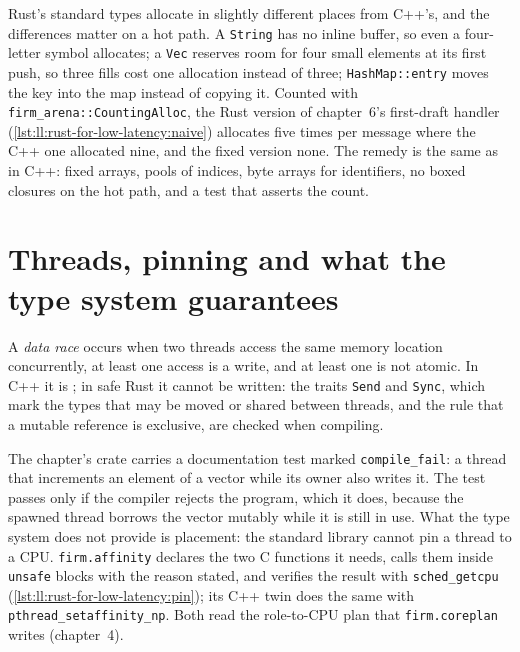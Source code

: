 Rust's standard types allocate in slightly different places from C++'s, and the differences matter on a hot path. A
\texttt{String} has no inline buffer, so even a four-letter symbol allocates; a \texttt{Vec} reserves room for four small
elements at its first push, so three fills cost one allocation instead of three; \texttt{HashMap::entry} moves the key into
the map instead of copying it. Counted with \texttt{firm\_arena::CountingAlloc}, the Rust version of chapter~6's first-draft
handler (\cref{lst:ll:rust-for-low-latency:naive}) allocates five times per message where the C++ one allocated nine, and the
fixed version none. The remedy is the same as in C++: fixed arrays, pools of indices, byte arrays for identifiers, no boxed
closures on the hot path, and a test that asserts the count.

\label{lst:ll:rust-for-low-latency:naive}

\section{Threads, pinning and what the type system guarantees}

\begin{definition}\label{def:ll:rust-for-low-latency:race}
A \emph{data race} occurs when two threads access the same memory location concurrently, at least one
access is a write, and at least one is not atomic. In C++ it is ; in safe Rust it cannot be written:
the traits \texttt{Send} and \texttt{Sync}, which mark the types that may be moved or shared between threads, and the rule
that a mutable reference is exclusive, are checked when compiling.
\end{definition}

The chapter's crate carries a documentation test marked \texttt{compile\_fail}: a thread that increments an element of a
vector while its owner also writes it. The test passes only if the compiler rejects the program, which it does, because
the spawned thread borrows the vector mutably while it is still in use. What the type system does not provide is
placement: the standard library cannot pin a thread to a CPU. \texttt{firm.affinity} declares the two C functions it needs,
calls them inside \texttt{unsafe} blocks with the reason stated, and verifies the result with \texttt{sched\_getcpu}
(\cref{lst:ll:rust-for-low-latency:pin}); its C++ twin does the same with \texttt{pthread\_setaffinity\_np}. Both read the
role-to-CPU plan that \texttt{firm.coreplan} writes (chapter~4).

